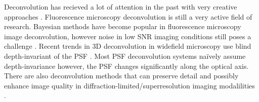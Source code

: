 \begin{definition}
	Deconvolution has recieved a lot of attention in the past with very creative approaches \citep{Mukamel2012,Verveer2007,Periasamy1999,Swedlow2007,Rooi2014}.
	Fluorescence microscopy deconvolution is still a very active field of research.
	Bayesian methods have become popular in fluorescence microscopy image deconvolution, however noise in low SNR imaging conditions still poses a challenge \citep{Wong2015}.
	Recent trends in 3D deconvolution in widefield microscopy use blind depth-invariant of the PSF \citep{Kim2015}.
	Most PSF deconvolution systems na{\"i}vely assume depth-invariance however, the PSF changes significantly along the optical axis.
	There are also deconvolution methods that can preserve detail and possibly enhance image quality in diffraction-limited/superresolution imaging modalilities \citep{Qin2016}.
\end{definition}

